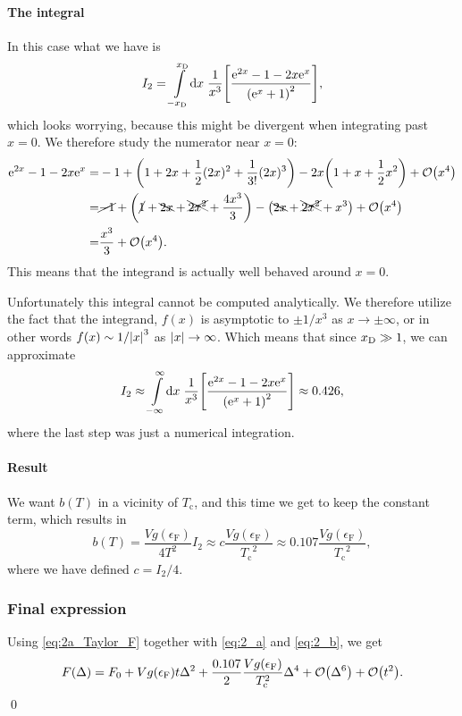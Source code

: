 \documentclass[11pt,letter, swedish, english
]{article}
\newcommand{\Tc}{\ensuremath{T_{\text{c}}}}
\newcommand{\eF}{\ensuremath{\epsilon_{\text{F}}}}
\begin{document}
\paragraph{The integral}
In this case what we have is 
\begin{equation}
I_2=\int_{-\xD}^{\xD}\!\rd{x}\;
\frac{1}{x^3}
\qty[
\frac{\ee^{2x}-1-2x\ee^{x}}{\qty(\ee^{x}+1)^2}
],
\end{equation}
which looks worrying, because this might be divergent when integrating
past $x=0$. 
We therefore study the numerator near $x=0$:
\begin{equation}
\begin{aligned}
\ee^{2x}-1-2x\ee^{x}=&-1 + \qty(1+2x+\frac{1}{2}(2x)^2+\frac{1}{3!}(2x)^3)
-2x\qty(1+x +\frac{1}{2}x^2) +\order{x^4}\\
=&\cancel{-1}+\qty(\cancel{1}+\bcancel{2x}+\xcancel{2x^2}+\frac{4x^3}{3})
-\qty(\bcancel{2x}+\xcancel{2x^2} +x^3) +\order{x^4}\\
=&\frac{x^3}{3}+\order{x^4}.
\end{aligned}
\end{equation}
This means that the integrand is actually well behaved around $x=0$.

Unfortunately this integral cannot be computed analytically. We
therefore utilize the fact that the integrand, $f(x)$ is asymptotic to
$\pm1/x^3$ as $x\to\pm\infty$, or in other words $f(x)\sim1/\abs{x}^3$ as
$\abs{x}\to\infty$. Which means that since $x_{\text{D}}\gg1$, we can
approximate
\begin{equation}
I_2\approx\int_{-\infty}^{\infty}\!\rd{x}\;
\frac{1}{x^3}
\qty[\frac{\ee^{2x}-1-2x\ee^{x}}{\qty(\ee^{x}+1)^2}]
\approx 0.426,
\end{equation}
where the last step was just a numerical integration.

\paragraph{Result}
We want $b(T)$ in a vicinity of $\Tc$, and this time we get to keep
the constant term, which results in
\begin{equation}\label{eq:2_b}
b(T)=\frac{Vg(\eF)}{4T^2}I_2
\approx c\frac{Vg(\eF)}{\Tc^2}\approx 0.107\frac{Vg(\eF)}{\Tc^2},
\end{equation}
where we have defined $c=I_2/4$.

\subsubsection{Final expression}
Using \eqref{eq:2a_Taylor_F} together with \eqref{eq:2_a} and
\eqref{eq:2_b}, we get
\begin{equation}\label{eq:2a_Taylor_F_final}
F(\Delta)=F_0+Vg(\eF)t\Delta^2 
+ \frac{0.107}{2}\frac{Vg(\eF)}{\Tc^2}\Delta^4 + \order{\Delta^6}+\order{t^2}.
\end{equation}
\qed
\end{document}
